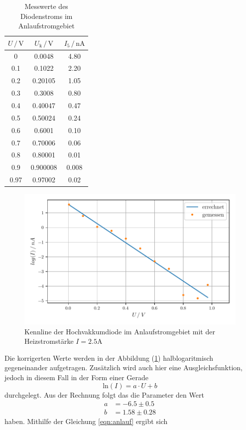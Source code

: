 \begin{table}
  \centering
  \caption{Messwerte des Diodenstroms im Anlaufstromgebiet}
  \label{tab:mess2}
  \begin{tabular}{c c c}
  \toprule
  $ U \,/\, \si{\volt} $ & $ U_{\text{k}} \,/\, \si{\volt} $ & $I_5 \,/\, \si{\nano\ampere}$\\
  \midrule 
  0    & 0.0048 &  4.80 \\
  0.1  & 0.1022 &  2.20 \\
  0.2  & 0.20105 &  1.05 \\
  0.3  & 0.3008 &  0.80 \\
  0.4  & 0.40047 &  0.47 \\
  0.5  & 0.50024 &  0.24 \\
  0.6  & 0.6001 &  0.10 \\
  0.7  & 0.70006 &  0.06 \\
  0.8  & 0.80001 &  0.01 \\
  0.9  & 0.900008 &  0.008 \\
  0.97 & 0.97002 &  0.02 \\
  \bottomrule
  \end{tabular}
\end{table}


\begin{figure} [H]
    \centering
    \includegraphics{Daten/gegenfeld.pdf}
    \caption{Kennline der Hochvakkumdiode im Anlaufstromgebiet mit der Heizstromstärke $I = 2.5 \si{\ampere}$}
    \label{fig:3}
\end{figure}


Die korrigerten Werte werden in der Abbildung (\ref{fig:3}) halblogaritmisch gegeneinander aufgetragen. Zusätzlich wird auch hier eine Ausgleichsfunktion, jedoch in diesem Fall in der
Form einer Gerade 
\begin{equation*}
    \text{ln} \left(I \right) = a \cdot U + b
\end{equation*}
durchgelegt. Aus der Rechnung folgt das die Parameter den Wert
\begin{align*}
    a &= -6.5 \pm 0.5\\
    b &= 1.58 \pm 0.28
\end{align*}
haben. Mithilfe der Gleichung \eqref{eqn:anlauf} ergibt sich

